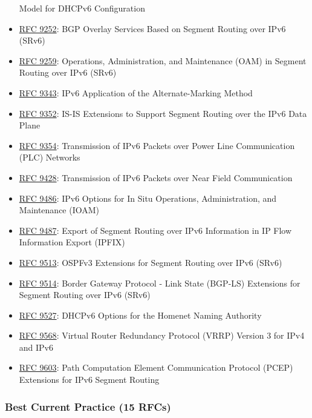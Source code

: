 \documentclass[
]{article}
\begin{document}
\begin{itemize}
  Model for DHCPv6 Configuration
\item
  \href{https://www.rfc-editor.org/info/rfc9252}{RFC 9252}: BGP Overlay
  Services Based on Segment Routing over IPv6 (SRv6)
\item
  \href{https://www.rfc-editor.org/info/rfc9259}{RFC 9259}: Operations,
  Administration, and Maintenance (OAM) in Segment Routing over IPv6
  (SRv6)
\item
  \href{https://www.rfc-editor.org/info/rfc9343}{RFC 9343}: IPv6
  Application of the Alternate-Marking Method
\item
  \href{https://www.rfc-editor.org/info/rfc9352}{RFC 9352}: IS-IS
  Extensions to Support Segment Routing over the IPv6 Data Plane
\item
  \href{https://www.rfc-editor.org/info/rfc9354}{RFC 9354}: Transmission
  of IPv6 Packets over Power Line Communication (PLC) Networks
\item
  \href{https://www.rfc-editor.org/info/rfc9428}{RFC 9428}: Transmission
  of IPv6 Packets over Near Field Communication
\item
  \href{https://www.rfc-editor.org/info/rfc9486}{RFC 9486}: IPv6 Options
  for In Situ Operations, Administration, and Maintenance (IOAM)
\item
  \href{https://www.rfc-editor.org/info/rfc9487}{RFC 9487}: Export of
  Segment Routing over IPv6 Information in IP Flow Information Export
  (IPFIX)
\item
  \href{https://www.rfc-editor.org/info/rfc9513}{RFC 9513}: OSPFv3
  Extensions for Segment Routing over IPv6 (SRv6)
\item
  \href{https://www.rfc-editor.org/info/rfc9514}{RFC 9514}: Border
  Gateway Protocol - Link State (BGP-LS) Extensions for Segment Routing
  over IPv6 (SRv6)
\item
  \href{https://www.rfc-editor.org/info/rfc9527}{RFC 9527}: DHCPv6
  Options for the Homenet Naming Authority
\item
  \href{https://www.rfc-editor.org/info/rfc9568}{RFC 9568}: Virtual
  Router Redundancy Protocol (VRRP) Version 3 for IPv4 and IPv6
\item
  \href{https://www.rfc-editor.org/info/rfc9603}{RFC 9603}: Path
  Computation Element Communication Protocol (PCEP) Extensions for IPv6
  Segment Routing
\end{itemize}

\subsubsection{Best Current Practice (15
RFCs)}\label{best-current-practice-15-rfcs}
\end{document}
